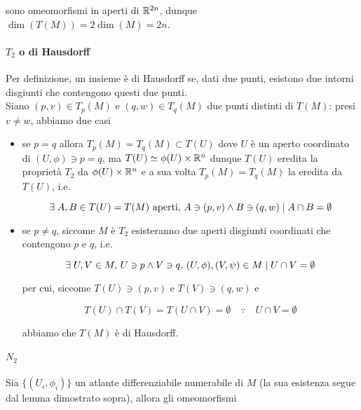 sono omeomorfismi in aperti di $ \mathbb{R}^{2n} $, dunque $ \dim(T(M)) = 2 \dim(M) = 2n $.

\paragraph{$ T_{2} $ o di Hausdorff}

Per definizione, un insieme è di Hausdorff se, dati due punti, esistono due intorni disgiunti che contengono questi due punti.\\
Siano $ (p,v) \in T_{p}(M) $ e $ (q,w) \in T_{q}(M) $ due punti distinti di $ T(M) $: presi $ v \neq w $, abbiamo due casi

\begin{itemize}
	\item se $ p = q $ allora $ T_{p}(M) = T_{q}(M) \subset T(U) $ dove $ U $ è un aperto coordinato di $ (U,\phi) \ni p=q $, ma $ T(U) \simeq \phi(U) \times \mathbb{R}^{n} $ dunque $ T(U) $ eredita la proprietà $ T_{2} $ da $ \phi(U) \times \mathbb{R}^{n} $ e a sua volta $ T_{p}(M) = T_{q}(M) $ la eredita da $ T(U) $, i.e.
	
	\begin{equation}
		\exists \; A,B \in T(U) = T(M) \text{ aperti}, \, A \ni (p,v) \wedge B \ni (q,w) \mid A \cap B = \emptyset
	\end{equation}
	
	\item se $ p \neq q $, siccome $ M $ è $ T_{2} $ esisteranno due aperti disgiunti coordinati che contengono $ p $ e $ q $, i.e.
	
	\begin{equation}
		\exists \; U,V \in M, \, U \ni p \wedge V \ni q, \, (U,\phi),(V,\psi) \in M \mid U \cap V = \emptyset
	\end{equation}

	per cui, siccome $ T(U) \ni (p,v) $ e $ T(V) \ni (q,w) $ e
	
	\begin{equation}
		T(U) \cap T(V) = T(U \cap V) = \emptyset \quad \because \quad U \cap V = \emptyset
	\end{equation}

	abbiamo che $ T(M) $ è di Hausdorff.
\end{itemize}

\paragraph{$ N_{2} $}

Sia $ \{(U_{i},\phi_{i})\} $ un atlante differenziabile numerabile di $ M $ (la sua esistenza segue dal lemma dimostrato sopra), allora gli omeomorfismi

